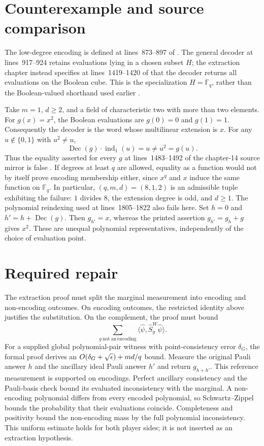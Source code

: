 \documentclass[11pt]{article}
\begin{document}
\section{Counterexample and source comparison}

The low-degree encoding is defined at lines~873--897 of
.  The general decoder at
lines~917--924 retains evaluations lying in a chosen subset $H$; the extraction
chapter instead specifies at lines~1419--1420 of
 that the
decoder returns all evaluations on the Boolean cube.  This is the specialization
$H=\mathbb F_q$, rather than the Boolean-valued shorthand used earlier
\cite[lines~873--924 and 1419--1420]{Ji2020MIPStar}.

Take $m=1$, $d\geq2$, and a field of characteristic two with more than two
elements.  For $g(x)=x^2$, the Boolean evaluations are $g(0)=0$ and $g(1)=1$.
Consequently the decoder is the word whose multilinear extension is $x$.
For any $u\notin\{0,1\}$ with $u^2\neq u$,
\[
  \operatorname{Dec}(g)\mathbin{\cdot}\operatorname{ind}_1(u)=u
  \neq u^2=g(u).
\]
Thus the equality asserted for every $g$ at lines~1483--1492 of the chapter-14
source mirror is false \cite[lines~1483--1492]{Ji2020MIPStar}.  If degrees at
least $q$ are allowed, equality as a function would not by itself prove encoding
membership either, since $x^q$ and $x$ induce the same function on $\mathbb F_q$.
In particular, $(q,m,d)=(8,1,2)$ is an admissible tuple exhibiting the
failure: $1$ divides $8$, the extension degree is odd, and $d\geq1$.
The polynomial reindexing used at lines~1805--1822 also fails here.  Set
$h=0$ and $h'=h+\operatorname{Dec}(g)$.  Then $g_{h'}=x$, whereas the
printed assertion $g_{h'}=g_h+g$ gives $x^2$.  These are unequal polynomial
representatives, independently of the choice of evaluation point.

\section{Required repair}

The extraction proof must split the marginal measurement into encoding and
non-encoding outcomes.  On encoding outcomes, the restricted identity above
justifies the substitution.  On the complement, the proof must bound
\[
  \sum_{g\ \mathrm{not\ an\ encoding}}
  \langle\widehat\psi,\widehat S_g^W\widehat\psi\rangle.
\]
For a supplied global polynomial-pair witness with point-consistency error
$\delta_G$, the formal proof derives an
$O(\delta_G+\sqrt{\epsilon})+md/q$ bound. Measure the original Pauli answer $h$ and
the ancillary ideal Pauli answer $h'$ and return $g_{h+h'}$. This reference
measurement is supported on encodings. Perfect ancillary consistency and the
Pauli-basis check bound its evaluated inconsistency with the marginal.
A non-encoding polynomial differs from every encoded polynomial, so
Schwartz--Zippel bounds the probability that their evaluations coincide.
Completeness and positivity bound the non-encoding mass by the full polynomial
inconsistency. This uniform estimate holds for both player sides; it is not
inserted as an extraction hypothesis.
\end{document}
